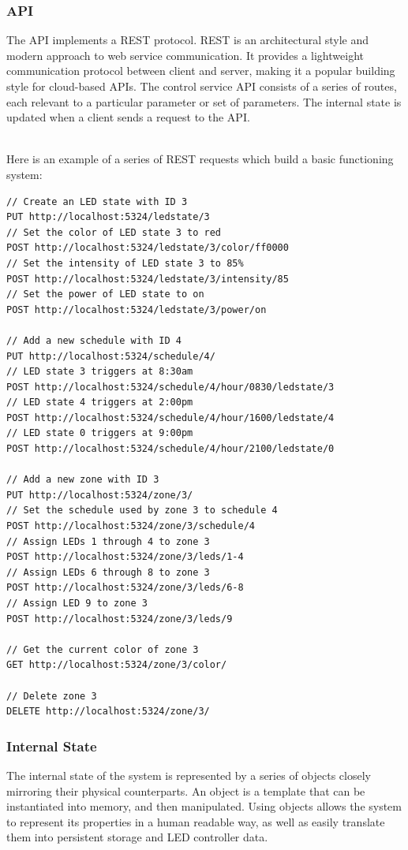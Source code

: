 \documentclass[onecolumn, draftclsnofoot,10pt, compsoc]{IEEEtran}
\begin{document}
			\subsubsection{API}
			The API implements a REST protocol. REST is an architectural style and modern approach to web service communication. \cite{rest1}
			It provides a lightweight communication protocol between client and server, making it a popular building style for cloud-based APIs.
			The control service API consists of a series of routes, each relevant to a particular parameter or set of parameters.
			The internal state is updated when a client sends a request to the API.

			\noindent \\Here is an example of a series of REST requests which build a basic functioning system:
			\begin{lstlisting}[language=XML]
// Create an LED state with ID 3
PUT http://localhost:5324/ledstate/3
// Set the color of LED state 3 to red
POST http://localhost:5324/ledstate/3/color/ff0000
// Set the intensity of LED state 3 to 85%
POST http://localhost:5324/ledstate/3/intensity/85
// Set the power of LED state to on
POST http://localhost:5324/ledstate/3/power/on

// Add a new schedule with ID 4
PUT http://localhost:5324/schedule/4/
// LED state 3 triggers at 8:30am
POST http://localhost:5324/schedule/4/hour/0830/ledstate/3
// LED state 4 triggers at 2:00pm
POST http://localhost:5324/schedule/4/hour/1600/ledstate/4
// LED state 0 triggers at 9:00pm
POST http://localhost:5324/schedule/4/hour/2100/ledstate/0

// Add a new zone with ID 3
PUT http://localhost:5324/zone/3/
// Set the schedule used by zone 3 to schedule 4
POST http://localhost:5324/zone/3/schedule/4
// Assign LEDs 1 through 4 to zone 3
POST http://localhost:5324/zone/3/leds/1-4
// Assign LEDs 6 through 8 to zone 3
POST http://localhost:5324/zone/3/leds/6-8
// Assign LED 9 to zone 3
POST http://localhost:5324/zone/3/leds/9

// Get the current color of zone 3
GET http://localhost:5324/zone/3/color/

// Delete zone 3
DELETE http://localhost:5324/zone/3/
\end{lstlisting}

			\subsubsection{Internal State}
			The internal state of the system is represented by a series of objects closely mirroring their physical counterparts.
			An object is a template that can be instantiated into memory, and then manipulated.
			Using objects allows the system to represent its properties in a human readable way, as well as easily translate them into persistent storage and LED controller data.
\end{document}
